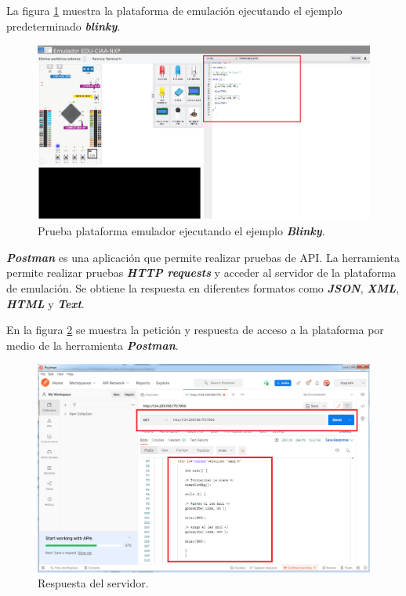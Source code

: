 La figura \ref{fig:PlataformaEmuladorBlinky} muestra la plataforma de emulación ejecutando el ejemplo predeterminado \textit{\textbf{blinky}}.

\begin{figure}[ht]
	\centering
	\includegraphics[scale=.21]{./Figures/PlataformaEmuladorBlinky.png}
	\caption{Prueba plataforma emulador ejecutando el ejemplo \textit{\textbf{Blinky}}.}
	\label{fig:PlataformaEmuladorBlinky}
\end{figure}

\textit{\textbf{Postman}} es una aplicación que permite realizar pruebas de API. La herramienta permite realizar pruebas \textit{\textbf{HTTP requests}} y acceder al servidor de la plataforma de emulación. Se obtiene la respuesta en diferentes formatos como \textit{\textbf{JSON}}, \textit{\textbf{XML}}, \textit{\textbf{HTML}} y \textit{\textbf{Text}}.

En la figura \ref{fig:PostmanBlinky2} se muestra la petición y respuesta de acceso a la plataforma por medio de la herramienta \textit{\textbf{Postman}}.

\hfill \break
\hfill \break
\hfill \break
\hfill \break
\hfill \break
\hfill \break
\hfill \break
\hfill \break
\hfill \break
\hfill \break

\begin{figure}[ht]
	\centering
	\includegraphics[scale=.40]{./Figures/PostmanBlinky2.png}
	\caption{Respuesta del servidor.}
	\label{fig:PostmanBlinky2}
\end{figure}


